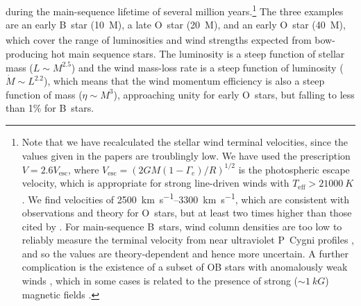 \message{ !name(dusty-bow-wave.tex)}\documentclass[useAMS, usenatbib, a4paper]{mnras}
\begin{document}
during the main-sequence lifetime of several million years.\footnote{%
  \label{fn:meyer-velocities-too-low}
  Note that we have recalculated the stellar wind terminal velocities,
  since the values given in the \citeauthor{Meyer:2014b} papers are
  troublingly low.  We have used the prescription
  \(V = 2.6 V_{\text{esc}}\), where
  \(V_{\text{esc}} = \left( 2 G M (1 - \Gamma_e)/ R \right)^{1/2}\) is the
  photospheric escape velocity, which is appropriate for strong
  line-driven winds with \(T_{\text{eff}} > \SI{21 000}{K}\)
  \citep{Lamers:1995a}.  We find velocities of
  \SIrange{2500}{3300}{km.s^{-1}}, which are consistent with
  observations and theory \citep{Vink:1999a} for O~stars, but at least
  two times higher than those cited by \citet{Meyer:2014b}. For
  main-sequence B~stars, wind column densities are too low to reliably
  measure the terminal velocity from near ultraviolet P~Cygni profiles
  \citep{Prinja:1989a}, and so the values are theory-dependent
  \citep{Krticka:2014a} and hence more uncertain.  A further
  complication is the existence of a subset of OB stars with
  anomalously weak winds \citep{Puls:2008a}, which in some cases is
  related to the presence of strong (\(\sim \SI{1}{kG}\)) magnetic fields
  \citep{Oskinova:2011b}.} %
The three examples are an early B~star (\SI{10}{M_\odot}), a late O~star
(\SI{20}{M_\odot}), and an early O~star (\SI{40}{M_\odot}), which cover the
range of luminosities and wind strengths expected from bow-producing
hot main sequence stars.  The luminosity is a steep function of
stellar mass (\(L \sim M^{2.5}\)) and the wind mass-loss rate is a steep
function of luminosity (\(\dot{M} \sim L^{2.2}\)), which means that the
wind momentum efficiency is also a steep function of mass
(\(\eta \sim M^3\)), approaching unity for early O~stars, but falling to
less than 1\% for B~stars.
\end{document}
